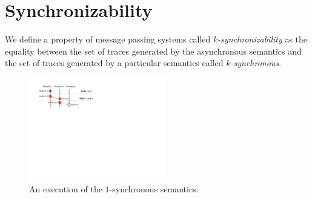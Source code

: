\section{Synchronizability}\label{sec:criterion}

We define a property of message passing systems called \emph{$k$-synchronizability} as the equality between the set of traces generated by the asynchronous semantics and the set of traces generated by a particular semantics called \emph{$k$-synchronous}. %

\begin{figure}[t]
\begin{center}
\includegraphics[width=6cm]{ex-blocking.pdf}
\end{center}
\caption{An execution of the $1$-synchronous semantics.}
\label{fig:ex-blocking}
\end{figure}

